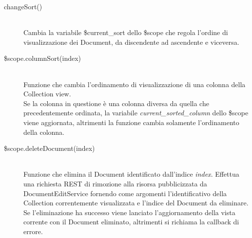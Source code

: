 \begin{description}
\begin{description}
  \item[changeSort()] \hfill \\
  Cambia la variabile \$current\_sort dello \$scope che regola l'ordine di visualizzazione dei Document, da discendente ad
  ascendente e viceversa.
  
  \item[\$scope.columnSort(index)] \hfill \\
  Funzione che cambia l'ordinamento di visualizzazione di una colonna della Collection view. \\
  Se la colonna in questione è una colonna diversa da quella che precedentemente ordinata,
  la variabile \emph{current\_sorted\_column} dello \$scope viene aggiornata, altrimenti la funzione cambia solamente
  l'ordinamento della colonna.
  
  \item[\$scope.deleteDocument(index)] \hfill \\
  Funzione che elimina il Document identificato dall'indice \emph{index}. Effettua una richiesta REST di rimozione alla risorsa
  pubblicizzata da DocumentEditService fornendo come argomenti l'identificativo della Collection correntemente visualizzata e l'indice
  del Document da eliminare. \\
  Se l'eliminazione ha successo viene lanciato l'aggiornamento della vista corrente con il Document eliminato, altrimenti si
  richiama la callback di errore.
  
 \end{description}
\end{description}

